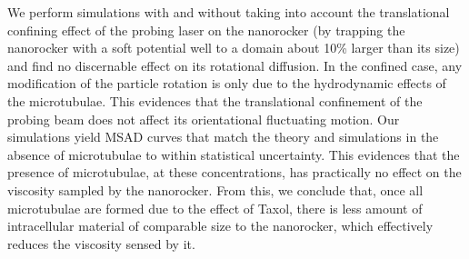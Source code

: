 \documentclass[twoside,openright,titlepage,numbers=noenddot,%
headinclude,footinclude,cleardoublepage=empty,abstract=on,
BCOR=5mm,fontsize=11pt, dvipsnames, paper=b5
]{scrreprt}
\begin{document}
We perform simulations with and without taking into account the translational confining effect of the probing laser on the nanorocker (by trapping the nanorocker with a soft potential well to a domain about 10\% larger than its size) and find no discernable effect on its rotational diffusion. In the confined case, any modification of the particle rotation is only due to the hydrodynamic effects of the microtubulae. This evidences that the translational confinement of the probing beam does not affect its orientational fluctuating motion.
Our simulations yield MSAD curves that match the theory and simulations in the absence of microtubulae to within statistical uncertainty. This evidences that the presence of microtubulae, at these concentrations, has practically no effect on the viscosity sampled by the nanorocker. From this, we conclude that, once all microtubulae are formed due to the effect of Taxol, there is less amount of intracellular material of comparable size to the nanorocker, which effectively reduces the viscosity sensed by it.

%
\end{document}
